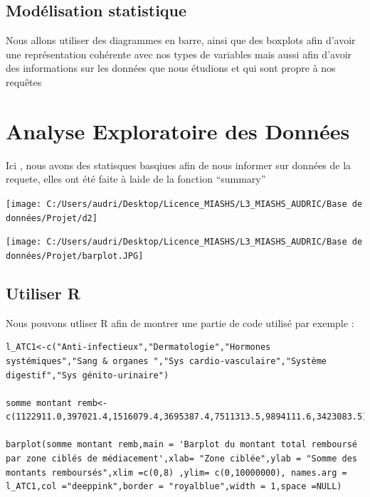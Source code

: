 \documentclass[mstat,12pt]{unswthesis}
\begin{document}
\hypertarget{moduxe9lisation-statistique}{%
\section{Modélisation statistique}\label{moduxe9lisation-statistique}}

\bigskip

Nous allons utiliser des diagrammes en barre, ainsi que des boxplots
afin d'avoir une représentation cohérente avec nos types de variables
mais aussi afin d'avoir des informations sur les données que nous
étudions et qui sont propre à nos requêtes

\hypertarget{analyse-exploratoire-des-donnuxe9es}{%
\chapter{Analyse Exploratoire des
Données}\label{analyse-exploratoire-des-donnuxe9es}}

Ici , nous avons des statisques basqiues afin de nous informer sur
données de la requete, elles ont été faite à laide de la fonction
``summary''

\medskip

\texttt{[image: C:/Users/audri/Desktop/Licence\_MIASHS/L3\_MIASHS\_AUDRIC/Base de données/Projet/d2]}

\medskip

\texttt{[image: C:/Users/audri/Desktop/Licence\_MIASHS/L3\_MIASHS\_AUDRIC/Base de données/Projet/barplot.JPG]}

\bigskip
\bigskip
\bigskip

\bigskip
\bigskip
\bigskip

\hypertarget{utiliser-r}{%
\section{Utiliser R}\label{utiliser-r}}

\centering

Nous pouvons utliser R afin de montrer une partie de code utilisé par
exemple :

\begin{verbatim}
l_ATC1<-c("Anti-infectieux","Dermatologie","Hormones systémiques","Sang & organes ","Sys cardio-vasculaire","Système digestif","Sys génito-urinaire")

somme montant remb<- c(1122911.0,397021.4,1516079.4,3695387.4,7511313.5,9894111.6,3423083.5)

barplot(somme montant remb,main = 'Barplot du montant total remboursé par zone ciblés de médiacement',xlab= "Zone ciblée",ylab = "Somme des montants remboursés",xlim =c(0,8) ,ylim= c(0,10000000), names.arg = l_ATC1,col ="deeppink",border = "royalblue",width = 1,space =NULL)
\end{verbatim}
\end{document}
